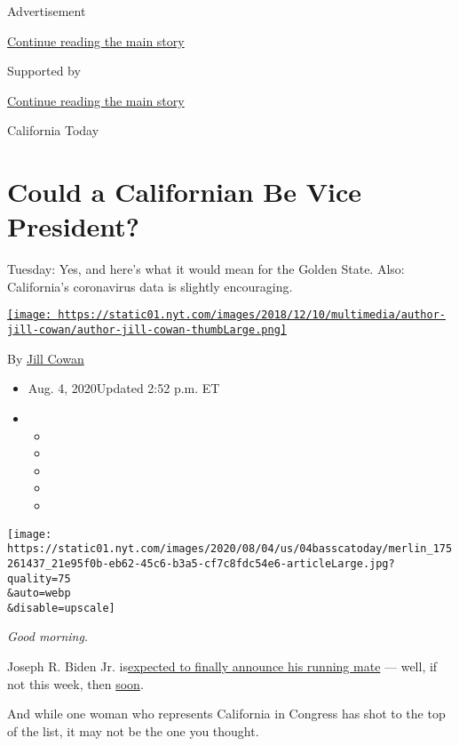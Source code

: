 Advertisement

\protect\hyperlink{after-top}{Continue reading the main story}

Supported by

\protect\hyperlink{after-sponsor}{Continue reading the main story}

California Today

\hypertarget{could-a-californian-be-vice-president}{%
\section{Could a Californian Be Vice
President?}\label{could-a-californian-be-vice-president}}

Tuesday: Yes, and here's what it would mean for the Golden State. Also:
California's coronavirus data is slightly encouraging.

\href{https://www.nytimes.com/by/jill-cowan}{\texttt{[image: https://static01.nyt.com/images/2018/12/10/multimedia/author-jill-cowan/author-jill-cowan-thumbLarge.png]}}

By \href{https://www.nytimes.com/by/jill-cowan}{Jill Cowan}

\begin{itemize}
\item
  Aug. 4, 2020Updated 2:52 p.m. ET
\item
  \begin{itemize}
  \item
  \item
  \item
  \item
  \item
  \end{itemize}
\end{itemize}

\texttt{[image: https://static01.nyt.com/images/2020/08/04/us/04basscatoday/merlin\_175261437\_21e95f0b-eb62-45c6-b3a5-cf7c8fdc54e6-articleLarge.jpg?quality=75\\\&auto=webp\\\&disable=upscale]}

\emph{Good morning.}

Joseph R. Biden Jr.
is\href{https://www.nytimes.com/2020/07/31/us/politics/joseph-biden-vice-president.html}{expected
to finally announce his running mate} --- well, if not this week, then
\href{https://www.nytimes.com/article/biden-vice-president-2020.html?}{soon}.

And while one woman who represents California in Congress has shot to
the top of the list, it may not be the one you thought.

